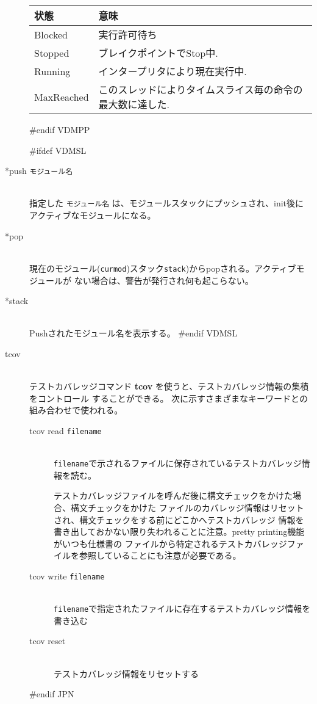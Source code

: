 \documentclass[\pformat,12pt]{article}
\begin{document}
\begin{description}
\begin{tabular}{lp{10cm}}\hline
状態 & 意味 \\ \hline
Blocked    & 実行許可待ち \\ 
Stopped    & ブレイクポイントでStop中.\\
Running    & インタープリタにより現在実行中. \\
MaxReached & このスレッドによりタイムスライス毎の命令の最大数に達した. \\ \hline 
\end{tabular}
#endif VDMPP

#ifdef VDMSL
\item[*push {\tt モジュール名}] \mbox{}\\
  指定した {\tt モジュール名} は、モジュールスタックにプッシュされ、init後にアクティブなモジュールになる。 
  
\item[*pop] \mbox{}\\
  現在のモジュール({\tt curmod})スタック{\tt stack})からpopされる。アクティブモジュールが
  ない場合は、警告が発行され何も起こらない。
  
\item[*stack]\mbox{}\\
  Pushされたモジュール名を表示する。
#endif VDMSL

\item[tcov]\mbox{}\\
テストカバレッジコマンド {\bf tcov} を使うと、テストカバレッジ情報の集積をコントロール
することができる。
次に示すさまざまなキーワードとの組み合わせで使われる。

\begin{description}
\item[tcov read \mbox{\texttt{filename}}] \mbox{}\\ 
  \texttt{filename}で示されるファイルに保存されているテストカバレッジ情報を読む。
  
  テストカバレッジファイルを呼んだ後に構文チェックをかけた場合、構文チェックをかけた
  ファイルのカバレッジ情報はリセットされ、構文チェックをする前にどこかへテストカバレッジ
  情報を書き出しておかない限り失われることに注意。pretty printing機能がいつも仕様書の
  ファイルから特定されるテストカバレッジファイルを参照していることにも注意が必要である。

\item[tcov write \mbox{\texttt{filename}}] \mbox{} \\ 
  \texttt{filename}で指定されたファイルに存在するテストカバレッジ情報を書き込む
  
\item[tcov reset] \mbox{} \\
  テストカバレッジ情報をリセットする
  
\end{description}
#endif JPN

\end{description}
\end{document}
